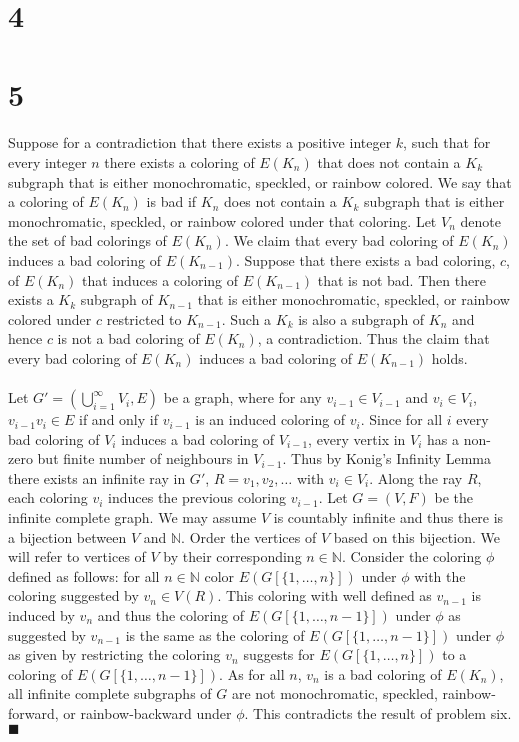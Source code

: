 \documentclass[letterpaper,12pt,oneside,onecolumn]{article}
\newcommand{\N}{\mathbb{N}} \newcommand{\R}{\mathbb{R}}
\begin{document}
\section*{4}

\section*{5}
\paragraph{}
Suppose for a contradiction that there exists a positive integer $k$, such that for every integer $n$ there exists a coloring of $E(K_n)$ that does not contain a $K_k$ subgraph that is either monochromatic, speckled, or rainbow colored. We say that a coloring of $E(K_n)$ is bad if $K_n$ does not contain a $K_k$ subgraph that is either monochromatic, speckled, or rainbow colored under that coloring. Let $V_n$ denote the set of bad colorings of $E(K_n)$. We claim that every bad coloring of $E(K_n)$ induces a bad coloring of $E(K_{n-1})$. Suppose that there exists a bad coloring, $c$, of $E(K_n)$ that induces a coloring of $E(K_{n-1})$ that is not bad. Then there exists a $K_k$ subgraph of $K_{n-1}$ that is either monochromatic, speckled, or rainbow colored under $c$ restricted to $K_{n-1}$. Such a $K_k$ is also a subgraph of $K_n$ and hence $c$ is not a bad coloring of $E(K_n)$, a contradiction. Thus the claim that every bad coloring of $E(K_n)$ induces a bad coloring of $E(K_{n-1})$ holds.
\paragraph{}
Let $G' = (\bigcup_{i=1}^\infty V_i, E)$ be a graph, where for any $v_{i-1} \in V_{i-1}$ and $ v_i \in V_i$, $v_{i-1}v_i \in E$ if and only if $v_{i-1}$ is an induced coloring of $v_i$. Since for all $i$ every bad coloring of $V_i$ induces a bad coloring of $V_{i-1}$, every vertix in $V_i$ has a non-zero but finite number of neighbours in $V_{i-1}$. Thus by Konig's Infinity Lemma there exists an infinite ray in $G'$, $R=v_1,v_2,\dots$ with $v_i \in V_i$. Along the ray $R$, each coloring $v_i$ induces the previous coloring $v_{i-1}$. Let $G=(V,F)$ be the infinite complete graph. We may assume $V$ is countably infinite and thus there is a bijection between $V$ and $\N$. Order the vertices of $V$ based on this bijection. We will refer to vertices of $V$ by their corresponding $n \in \N$. Consider the coloring $\phi$ defined as follows: for all $n \in \N$ color $E(G[\{1,\dots,n\}])$ under $\phi$ with the coloring suggested by $v_n \in V(R)$. This coloring with well defined as $v_{n-1}$ is induced by $v_n$ and thus the coloring of $E(G[\{1,\dots,n-1\}])$ under $\phi$ as suggested by $v_{n-1}$ is the same as the coloring of $E(G[\{1,\dots,n-1\}])$ under $\phi$ as given by restricting the coloring $v_n$ suggests for $E(G[\{1,\dots,n\}])$ to a coloring of $E(G[\{1,\dots, n-1\}])$. As for all $n$, $v_n$ is a bad coloring of $E(K_n)$, all infinite complete subgraphs of $G$ are not monochromatic, speckled, rainbow-forward, or rainbow-backward under $\phi$. This contradicts the result of problem six. $\blacksquare$
\end{document}
